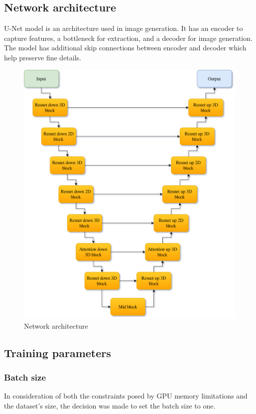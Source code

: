\documentclass[11pt,a4paper]{report}
\begin{document}
\subsection{Network architecture}
U-Net model is an architecture used in image generation. It has an encoder to capture features, a bottleneck for extraction, and a decoder for image generation. The model has additional skip connections between encoder and decoder which help preserve fine details.
\begin{figure}[H]
	\centering
	\includegraphics[scale=0.16]{images/ModelGraph.drawio}
    \caption{Network architecture}
\end{figure}
\subsection{Training parameters}
\subsubsection{Batch size}
In consideration of both the constraints posed by GPU memory limitations and the dataset's size, the decision was made to set the batch size to one.
\end{document}

